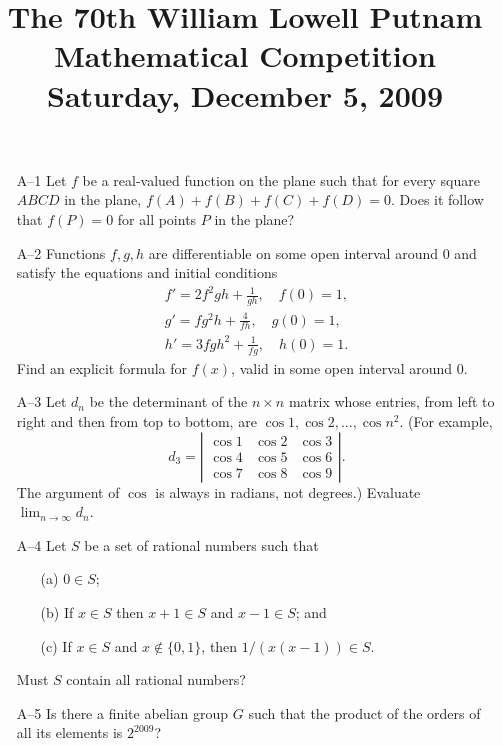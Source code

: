 \documentclass[amssymb,twocolumn,pra,10pt,aps]{revtex4-1}
\begin{document}
\title{The 70th William Lowell Putnam Mathematical Competition \\
    Saturday, December 5, 2009}
\maketitle

\begin{itemize}

\item[A--1]
Let $f$ be a real-valued function on the plane such that for every
square $ABCD$ in the plane, $f(A)+f(B)+f(C)+f(D)=0$. Does it follow that
$f(P)=0$ for all points $P$ in the plane?

\item[A--2]
Functions $f,g,h$ are differentiable on some open interval around $0$
and satisfy the equations and initial conditions
\begin{gather*}
f' = 2f^2gh+\frac{1}{gh},\quad f(0)=1, \\
g'=fg^2h+\frac{4}{fh}, \quad g(0)=1, \\
h'=3fgh^2+\frac{1}{fg}, \quad h(0)=1.
\end{gather*}
Find an explicit formula for $f(x)$, valid in some open interval around $0$.

\item[A--3]
Let $d_n$ be the determinant of the $n \times n$ matrix whose entries, from
left to right and then from top to bottom, are $\cos 1, \cos 2, \dots, \cos
n^2$. (For example,
\[
 d_3 = \left| \begin{matrix} \cos 1 & \cos 2 & \cos 3 \\
               \cos 4 & \cos 5 & \cos 6 \\
\cos 7 & \cos 8 & \cos 9
              \end{matrix} \right|.
\]
The argument of $\cos$ is always in radians, not degrees.) Evaluate
$\lim_{n\to\infty} d_n$.

\item[A--4]
Let $S$ be a set of rational numbers such that
\begin{enumerate}
\item[(a)] $0 \in S$;
\item[(b)] If $x \in S$ then $x+1\in S$ and $x-1\in S$; and
\item[(c)] If $x\in S$ and $x\not\in\{0,1\}$, then $1/(x(x-1))\in S$.
\end{enumerate}
Must $S$ contain all rational numbers?

\item[A--5]
Is there a finite abelian group $G$ such that the product of the
orders of all its elements is $2^{2009}$?


\end{itemize}
\end{document}
